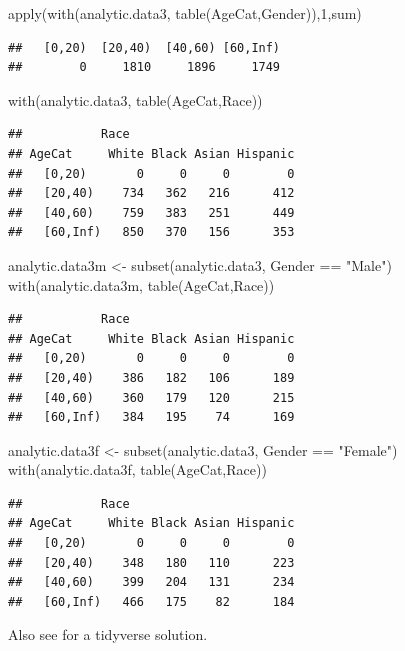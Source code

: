 \documentclass[
]{book}
\newenvironment{Shaded}{\begin{snugshade}}{\end{snugshade}}
\newcommand{\DecValTok}[1]{\textcolor[rgb]{0.00,0.00,0.81}{#1}}
\newcommand{\FunctionTok}[1]{\textcolor[rgb]{0.00,0.00,0.00}{#1}}
\newcommand{\NormalTok}[1]{#1}
\newcommand{\OtherTok}[1]{\textcolor[rgb]{0.56,0.35,0.01}{#1}}
\newcommand{\SpecialCharTok}[1]{\textcolor[rgb]{0.00,0.00,0.00}{#1}}
\newcommand{\StringTok}[1]{\textcolor[rgb]{0.31,0.60,0.02}{#1}}
\begin{document}
\begin{Shaded}
\begin{Highlighting}[]
\FunctionTok{apply}\NormalTok{(}\FunctionTok{with}\NormalTok{(analytic.data3, }\FunctionTok{table}\NormalTok{(AgeCat,Gender)),}\DecValTok{1}\NormalTok{,sum)}
\end{Highlighting}
\end{Shaded}

\begin{verbatim}
##   [0,20)  [20,40)  [40,60) [60,Inf) 
##        0     1810     1896     1749
\end{verbatim}

\begin{Shaded}
\begin{Highlighting}[]
\FunctionTok{with}\NormalTok{(analytic.data3, }\FunctionTok{table}\NormalTok{(AgeCat,Race))}
\end{Highlighting}
\end{Shaded}

\begin{verbatim}
##           Race
## AgeCat     White Black Asian Hispanic
##   [0,20)       0     0     0        0
##   [20,40)    734   362   216      412
##   [40,60)    759   383   251      449
##   [60,Inf)   850   370   156      353
\end{verbatim}

\begin{Shaded}
\begin{Highlighting}[]
\NormalTok{analytic.data3m }\OtherTok{\textless{}{-}} \FunctionTok{subset}\NormalTok{(analytic.data3, }
\NormalTok{                          Gender }\SpecialCharTok{==} \StringTok{"Male"}\NormalTok{)}
\FunctionTok{with}\NormalTok{(analytic.data3m, }\FunctionTok{table}\NormalTok{(AgeCat,Race))}
\end{Highlighting}
\end{Shaded}

\begin{verbatim}
##           Race
## AgeCat     White Black Asian Hispanic
##   [0,20)       0     0     0        0
##   [20,40)    386   182   106      189
##   [40,60)    360   179   120      215
##   [60,Inf)   384   195    74      169
\end{verbatim}

\begin{Shaded}
\begin{Highlighting}[]
\NormalTok{analytic.data3f }\OtherTok{\textless{}{-}} \FunctionTok{subset}\NormalTok{(analytic.data3, }
\NormalTok{                          Gender }\SpecialCharTok{==} \StringTok{"Female"}\NormalTok{)}
\FunctionTok{with}\NormalTok{(analytic.data3f, }\FunctionTok{table}\NormalTok{(AgeCat,Race))}
\end{Highlighting}
\end{Shaded}

\begin{verbatim}
##           Race
## AgeCat     White Black Asian Hispanic
##   [0,20)       0     0     0        0
##   [20,40)    348   180   110      223
##   [40,60)    399   204   131      234
##   [60,Inf)   466   175    82      184
\end{verbatim}

Also see \citet{ds} for a tidyverse solution.

  
\end{document}
